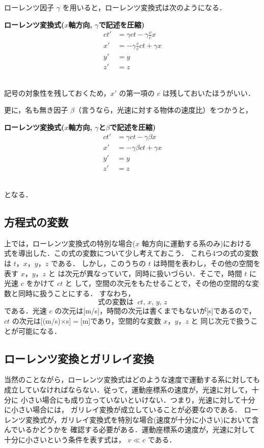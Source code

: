 ローレンツ因子 $\gamma$ を用いると，ローレンツ変換式は次のようになる．
    \begin{itembox}[l]{\textbf{ローレンツ変換式($x$軸方向, $\gamma$で記述を圧縮)}}
        \begin{align}
        ct' &= \gamma  ct - \gamma \frac{v}{c}  x \\
        x'  &= -\gamma \frac{v}{c} ct + \gamma  x \\
        y'  &= y \\
        z'  &= z
        \end{align}
    \end{itembox}\\
記号の対象性を残しておくため，$x'$ の第一項の $c$ は残しておいたほうがいい．

更に，名も無き因子 $\beta$（言うなら，光速に対する物体の速度比）をつかうと，
\begin{itembox}[l]{\textbf{ローレンツ変換式($x$軸方向, $\gamma$と$\beta$で記述を圧縮)}}
    \begin{align*}
    ct' &= \gamma  ct - \gamma \beta  x \\
    x'  &= -\gamma \beta ct + \gamma  x \\
    y'  &= y \\
    z'  &= z
    \end{align*}
\end{itembox}\\
となる．

\subsection{方程式の変数}
上では，ローレンツ変換式の特別な場合($x$ 軸方向に運動する系のみ)における
式を導出した．この式の変数について少し考えておこう．
これら4つの式の変数は $t$，$x$，$y$，$z$ である．
しかし，このうちの $t$ は時間を表わし，その他の空間を表す $x$，$y$，$z$ と
は次元が異なっていて，同時に扱いづらい．そこで，時間 $t$ に光速 $c$ をかけて $ct$ と
して，空間の次元をもたせることで，その他の空間的な変数と同時に扱うことにする．
すなわち，
\begin{equation*}
\mbox{式の変数は}\;\; ct,\,x,\,y,\,z
\end{equation*}
である．光速 $c$ の次元は[m/s]，時間の次元は書くまでもないが[s]であるので，
$ct$ の次元は[(m/s)$\times$s]$=$[m]であり，空間的な変数 $x$，$y$，$z$ と
同じ次元で扱うことが可能になる．

\subsection{ローレンツ変換とガリレイ変換}
当然のことながら，ローレンツ変換式はどのような速度で運動する系に対しても
成立していなければならない．従って，運動座標系の速度が，光速に対して，十分に
小さい場合にも成り立っていないといけない．つまり，光速に対して十分に小さい場合には，
ガリレイ変換が成立していることが必要なのである．
ローレンツ変換式が，ガリレイ変換式を特別な場合(速度が十分に小さい)において含んでいるかどうかを
確認する必要がある．運動座標系の速度が，光速に対して十分に小さいという条件を表す式は，
$v\ll c$ である．

